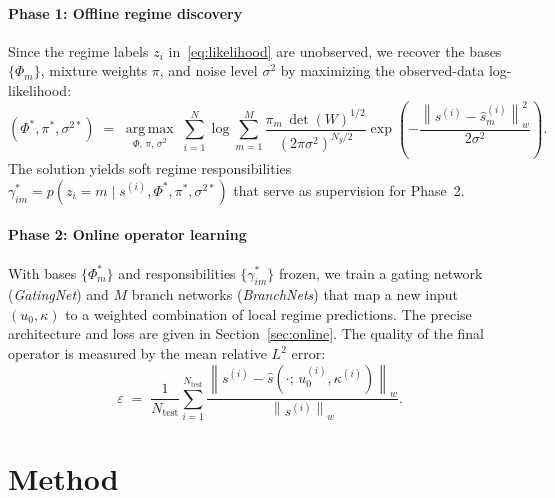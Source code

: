 \documentclass[preprint,10pt]{elsarticle}
\newcommand{\norm}[1]{\left\|#1\right\|_w}
\newcommand{\normsq}[1]{\left\|#1\right\|_w^{2}}
\newcommand{\hats}{\hat{s}}
\begin{document}
\paragraph{Phase 1: Offline regime discovery}

Since the regime labels $z_i$ in~\eqref{eq:likelihood} are unobserved,
we recover the bases $\{\Phi_m\}$, mixture weights $\pi$, and noise
level $\sigma^2$ by maximizing the observed-data log-likelihood:
\begin{equation}
  (\Phi^*,\pi^*,\sigma^{2*})
  \;=\; \operatorname*{arg\,max}_{\Phi,\,\pi,\,\sigma^2}
  \;\sum_{i=1}^N \log \sum_{m=1}^M
    \frac{\pi_m\,\det(W)^{1/2}}{(2\pi\sigma^2)^{N_y/2}}
    \exp\!\!\left(-\frac{\normsq{s^{(i)}-\hats_m^{(i)}}}{2\sigma^2}\right).
  \label{eq:mle}
\end{equation}
The solution yields soft regime responsibilities
$\gamma_{im}^* = p(z_i{=}m \mid s^{(i)},\Phi^*,\pi^*,\sigma^{2*})$
that serve as supervision for Phase~2.



\paragraph{Phase 2: Online operator learning}

With bases $\{\Phi_m^*\}$ and responsibilities $\{\gamma_{im}^*\}$ frozen,
we train a gating network (\emph{GatingNet}) and $M$ branch networks (\emph{BranchNets}) that map a new input
$(u_0, \kappa)$ to a weighted combination of local regime predictions.
The precise architecture and loss are given in Section~\ref{sec:online}.
The quality of the final operator is measured by the mean relative $L^2$ error:
\begin{equation}
  \varepsilon \;=\; \frac{1}{N_\mathrm{test}}
  \sum_{i=1}^{N_\mathrm{test}}
  \frac{\norm{s^{(i)} - \hat{s}(\cdot;\,u_0^{(i)},\kappa^{(i)})}}
       {\norm{s^{(i)}}} .
  \label{eq:metric}
\end{equation}















\section{Method}\label{sec:method}
\end{document}
